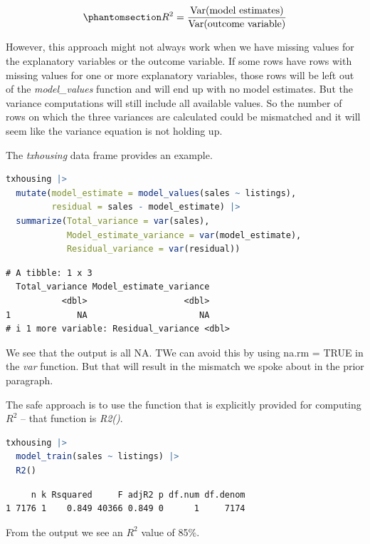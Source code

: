 \documentclass[
  12pt,
  letterpaper,
  DIV=11,
  numbers=noendperiod]{scrreprt}
\begin{document}
\begin{equation}\phantomsection\label{eq-crude-rsq-1}{
R^2
=
\frac{\text{Var}(\text{model estimates})}
     {\text{Var}(\text{outcome variable})}
}\end{equation}

However, this approach might not always work when we have missing values
for the explanatory variables or the outcome variable. If some rows have
rows with missing values for one or more explanatory variables, those
rows will be left out of the \emph{model\_values} function and will end
up with no model estimates. But the variance computations will still
include all available values. So the number of rows on which the three
variances are calculated could be mismatched and it will seem like the
variance equation is not holding up.

The \emph{txhousing} data frame provides an example.

\begin{lstlisting}[language=R]
txhousing |> 
  mutate(model_estimate = model_values(sales ~ listings),
         residual = sales - model_estimate) |>
  summarize(Total_variance = var(sales),
            Model_estimate_variance = var(model_estimate),
            Residual_variance = var(residual))
\end{lstlisting}

\begin{lstlisting}
# A tibble: 1 x 3
  Total_variance Model_estimate_variance
           <dbl>                   <dbl>
1             NA                      NA
# i 1 more variable: Residual_variance <dbl>
\end{lstlisting}

We see that the output is all NA. TWe can avoid this by using na.rm =
TRUE in the \emph{var} function. But that will result in the mismatch we
spoke about in the prior paragraph.

The safe approach is to use the function that is explicitly provided for
computing \(R^2\) -- that function is \emph{R2()}.

\begin{lstlisting}[language=R]
txhousing |> 
  model_train(sales ~ listings) |> 
  R2()
\end{lstlisting}

\begin{lstlisting}
     n k Rsquared     F adjR2 p df.num df.denom
1 7176 1    0.849 40366 0.849 0      1     7174
\end{lstlisting}

From the output we see an \(R^2\) value of 85\%.
\end{document}
